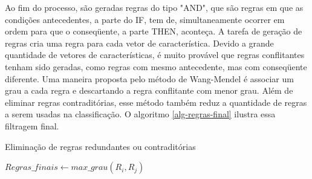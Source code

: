 

Ao fim do processo, são geradas regras do tipo "AND", que são regras em que as condições antecedentes, a parte do IF, tem de, simultaneamente ocorrer em ordem para que o conseqüente, a parte THEN, aconteça. A tarefa de geração de regras cria uma regra para cada vetor de característica. Devido a grande quantidade de vetores de características, é muito provável que regras conflitantes tenham sido geradas, como regras com mesmo antecedente, mas com conseqüente diferente. Uma maneira proposta pelo método de Wang-Mendel é associar um grau a cada regra e descartando a regra conflitante com menor grau. Além de eliminar regras contraditórias, esse método também reduz a quantidade de regras a serem usadas na classificação. O algoritmo \ref{alg-regras-final} ilustra essa filtragem final.

\begin{algorithm}
\begin{algorithmic}[1]
\caption{Eliminação de regras redundantes ou contraditórias}
\label{alg-regras-final}
           \STATE $Regras\_finais \leftarrow max\_grau(R_i,R_j)$
       \ENDIF    
   \ENDFOR
\ENDFOR
\end{algorithmic}
\end{algorithm}

